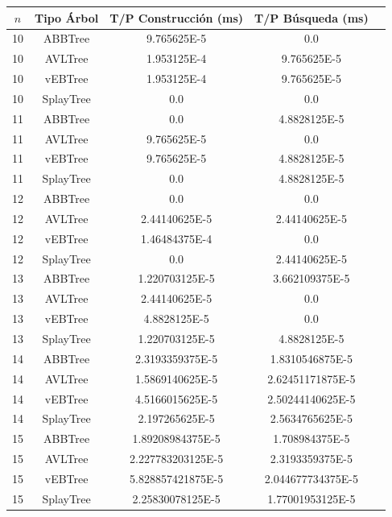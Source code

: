 \documentclass[letterpaper,12pt]{article}
\begin{document}
\begin{tabular}{|c|c|c|c|c|}
\hline
\textbf{$n$} & \textbf{Tipo Árbol} & \textbf{T/P Construcción (ms)} & \textbf{T/P Búsqueda (ms)} \\
\hline
10 & ABBTree & 9.765625E-5 & 0.0 \\
\hline
10 & AVLTree & 1.953125E-4 & 9.765625E-5 \\
\hline
10 & vEBTree & 1.953125E-4 & 9.765625E-5\\
\hline
10 & SplayTree & 0.0 & 0.0 \\
\hline
\hline
11 & ABBTree & 0.0 & 4.8828125E-5 \\
\hline
11 & AVLTree & 9.765625E-5 & 0.0 \\
\hline
11 & vEBTree & 9.765625E-5 & 4.8828125E-5\\
\hline
11 & SplayTree & 0.0 & 4.8828125E-5 \\
\hline
\hline
12 & ABBTree & 0.0 & 0.0  \\
\hline
12 & AVLTree & 2.44140625E-5 & 2.44140625E-5 \\
\hline
12 & vEBTree & 1.46484375E-4 & 0.0\\
\hline
12 & SplayTree & 0.0 & 2.44140625E-5 \\
\hline
\hline
13 & ABBTree & 1.220703125E-5 & 3.662109375E-5  \\
\hline
13 & AVLTree & 2.44140625E-5 & 0.0 \\
\hline
13 & vEBTree & 4.8828125E-5 & 0.0\\
\hline
13 & SplayTree & 1.220703125E-5 & 4.8828125E-5 \\
\hline
\hline
14 & ABBTree & 2.3193359375E-5 & 1.8310546875E-5 \\
\hline
14 & AVLTree & 1.5869140625E-5 & 2.62451171875E-5 \\
\hline
14 & vEBTree & 4.5166015625E-5 & 2.50244140625E-5\\
\hline
14 & SplayTree & 2.197265625E-5 & 2.5634765625E-5 \\
\hline
\hline
15 & ABBTree & 1.89208984375E-5 & 1.708984375E-5 \\
\hline
15 & AVLTree & 2.227783203125E-5 & 2.3193359375E-5 \\
\hline
15 & vEBTree & 5.828857421875E-5  & 2.044677734375E-5\\
\hline
15 & SplayTree & 2.25830078125E-5 & 1.77001953125E-5 \\
\hline
\end{tabular}
\end{document}
